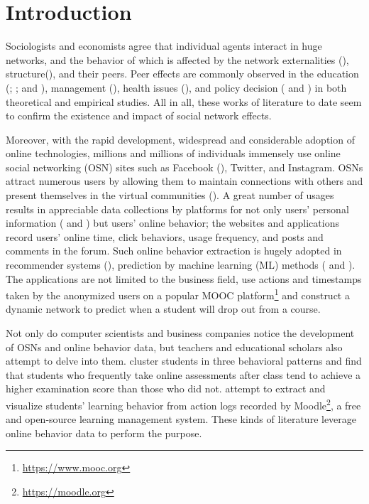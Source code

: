 \documentclass[a4paper]{article}
\theoremstyle{plain}
\begin{document}
\newpage

\section{Introduction}

Sociologists and economists agree that individual agents interact
in huge networks, and the behavior of which is affected by the network
externalities (\citet{nwExtern}), structure(\citet{struct}), and their peers.
Peer effects are commonly observed in the education (\citet{eduPeer}; \citet{idenEduPeer};
\citet{eduPeerBook} and \citet{school}), management (\citet{entre}), health issues
(\citet{smoke}),
and policy decision (\citet{author2} and \citet{author1})
in both theoretical and empirical studies.
All in all, these works of literature to date seem to confirm the existence and impact
of social network effects.

Moreover, with the rapid development, widespread and
considerable adoption of online technologies,
millions and millions of individuals immensely use online social networking (OSN)
sites such as Facebook (\citet{FB}), Twitter, and Instagram.
OSNs attract numerous users by
allowing them to maintain connections with others and present themselves
in the virtual communities (\citet{FB}).
A great number of usages results in appreciable data collections by platforms for
not only users' personal information (\citet{data} and \citet{digi}) but users' online behavior;
the websites and applications record users' online time, click behaviors, 
usage frequency, and posts and comments in the forum.
Such online behavior extraction is hugely adopted in recommender systems
(\citet{rec}), prediction by machine learning (ML) methods (\citet{CTR} and \citet{click}).
The applications are not limited to the business field,
\citet{mooc} use actions and timestamps taken by the anonymized users on a popular MOOC 
platform\footnote{\url{https://www.mooc.org}} 
and construct a dynamic network to predict when a student will drop out from
a course.

Not only do computer scientists and business companies notice the development
of OSNs and online behavior data, but teachers and educational scholars also
attempt to delve into them.
\citet{selfas} cluster students in three behavioral patterns
and find that students who frequently take online assessments after class tend to
achieve a higher examination score than those who did not.
\citet{moodle} attempt to extract and visualize students' learning behavior
from action logs recorded by Moodle\footnote{\url{https://moodle.org}}, 
a free and open-source learning management system.
These kinds of literature leverage online behavior data to perform the purpose.
\end{document}
